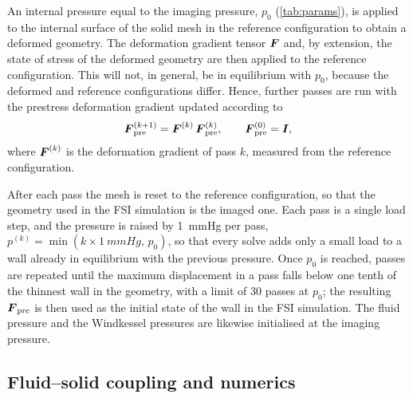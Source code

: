 An internal pressure equal to the imaging pressure, $p_0$ (\cref{tab:params}), is applied to the internal surface of the solid mesh in the reference configuration to obtain a deformed geometry.
The deformation gradient tensor $\boldsymbol{F}$ and, by extension, the state of stress of the deformed geometry are then applied to the reference configuration.
This will not, in general, be in equilibrium with $p_0$, because the deformed and reference configurations differ.
Hence, further passes are run with the prestress deformation gradient updated according to
\begin{equation}
  \boldsymbol{F}_{\mathrm{pre}}^{(k+1)} = \boldsymbol{F}^{(k)}\,\boldsymbol{F}_{\mathrm{pre}}^{(k)},
  \qquad \boldsymbol{F}_{\mathrm{pre}}^{(0)} = \boldsymbol{I},
  \label{eq:MULF}
\end{equation}
where $\boldsymbol{F}^{(k)}$ is the deformation gradient of pass $k$, measured from the reference configuration.

After each pass the mesh is reset to the reference configuration, so that the geometry used in the FSI simulation is the imaged one.
Each pass is a single load step, and the pressure is raised by \SI{1}{mmHg} per pass, $p^{(k)} = \min(k \times \SI{1}{mmHg},\, p_0)$, so that every solve adds only a small load to a wall already in equilibrium with the previous pressure.
Once $p_0$ is reached, passes are repeated until the maximum displacement in a pass falls below one tenth of the thinnest wall in the geometry, with a limit of 30 passes at $p_0$; the resulting $\boldsymbol{F}_{\mathrm{pre}}$ is then used as the initial state of the wall in the FSI simulation.
The fluid pressure and the Windkessel pressures are likewise initialised at the imaging pressure.

\subsection{Fluid--solid coupling and numerics}\label{sec:fsi}

